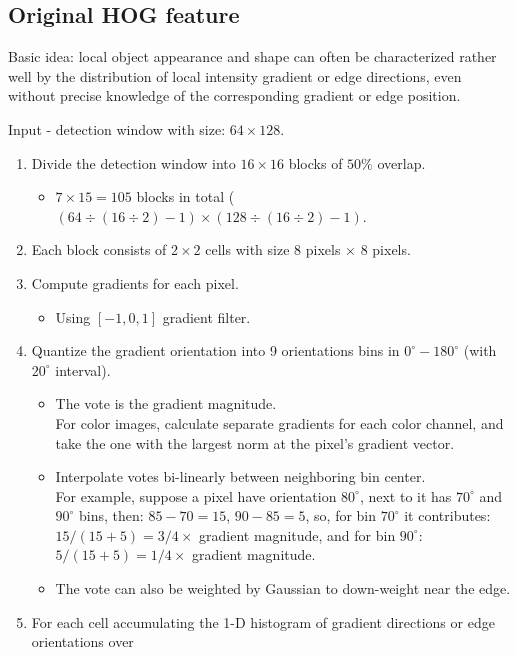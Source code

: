 \documentclass[12pt]{article}
\numberwithin{equation}{section}
\begin{document}
\subsection{Original HOG feature  \cite{dalal2005histograms} } \label{ch:hog}
Basic idea: local object appearance and shape can often be characterized rather well
by the distribution of local intensity gradient or edge directions, even without precise knowledge
of the corresponding gradient or edge position. \par
Input - detection window with size: $64 \times 128$. 
\begin{enumerate}
	\item Divide the detection window into $16 \times 16$ blocks of $50\%$ overlap.
		\begin{itemize}
			\item $7 \times 15 = 105$ blocks in total ($(64 \div (16 \div 2) - 1) \times 
				(128 \div (16 \div 2) - 1)$. 
		\end{itemize}
	\item Each block consists of $2 \times 2$ cells with size 8 pixels $ \times $ 8 pixels.
	\item Compute gradients for each pixel.
		\begin{itemize}
			\item Using $[-1, 0, 1]$ gradient filter.
		\end{itemize}
	\item Quantize the gradient orientation into 9 orientations bins in $0^\circ-180^\circ$
	(with $20^\circ$ interval).
		\begin{itemize}
			\item The vote is the gradient magnitude. \\
			For color images, calculate separate gradients for each color channel, and take the one with 
			the largest norm at the pixel's gradient vector.
			\item Interpolate votes bi-linearly between neighboring bin center. \\
			 For example, suppose a pixel have orientation $80^\circ$, next to it has $70^\circ$ and 
			 $90^\circ$ bins, then: $85-70=15$, $90-85=5$, so, for bin $70^\circ$ it contributes:
			  $15/(15+5)=3/4 \times$ gradient magnitude, and for bin $90^\circ$: $5/(15+5)=1/4 \times$
			  gradient magnitude.
			\item The vote can also be weighted by Gaussian to down-weight near the edge.
		\end{itemize}
	\item For each cell accumulating the 1-D histogram of gradient directions or edge orientations over

\end{enumerate}
\end{document}
